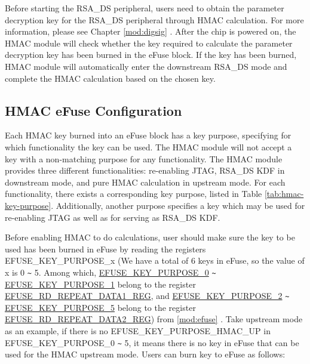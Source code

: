 \documentclass[main\_\_EN.tex]{subfiles}
\begin{document}
Before starting the RSA\_DS peripheral, users need to obtain the parameter decryption key for the RSA\_DS peripheral through HMAC calculation. For more information, please see Chapter \ref{mod:digsig} \textit{}.
After the chip is powered on, the HMAC module will check whether the key required to calculate the parameter decryption key has been burned in the eFuse block. If the key has been burned, HMAC module will automatically enter the downstream RSA\_DS mode and complete the HMAC calculation based on the chosen key.

\subsection{HMAC eFuse Configuration}
\label{sec:hmac-config-function}

Each HMAC key burned into an eFuse block has a key purpose, specifying for which functionality the key can be used. The HMAC module will not accept a key with a non-matching purpose for any functionality. The HMAC module provides three different functionalities: re-enabling JTAG, RSA\_DS KDF in downstream mode, and pure HMAC calculation in upstream mode. For each functionality, there exists a corresponding key purpose, listed in Table \ref{tab:hmac-key-purpose}. Additionally, another purpose specifies a key which may be used for re-enabling JTAG as well as for serving as RSA\_DS KDF.

Before enabling HMAC to do calculations, user should make sure the key to be used has been burned in eFuse by reading the registers EFUSE\_KEY\_PURPOSE\_x (We have a total of 6 keys in eFuse, so the value of x is 0 \verb+~+ 5. Among which, \hyperref[fielddesc:EFUSEKEYPURPOSE0]{EFUSE\_KEY\_PURPOSE\_0} \verb+~+ \hyperref[fielddesc:EFUSEKEYPURPOSE1]{EFUSE\_KEY\_PURPOSE\_1} belong to the register \hyperref[regdesc:EFUSERDREPEATDATA1REG]{EFUSE\_RD\_REPEAT\_DATA1\_REG}, and \hyperref[fielddesc:EFUSEKEYPURPOSE2]{EFUSE\_KEY\_PURPOSE\_2} \verb+~+ \hyperref[fielddesc:EFUSEKEYPURPOSE5]{EFUSE\_KEY\_PURPOSE\_5} belong to the register \hyperref[regdesc:EFUSERDREPEATDATA2REG]{EFUSE\_RD\_REPEAT\_DATA2\_REG}) from \ref{mod:efuse} \textit{}. Take upstream mode as an example, if there is no EFUSE\_KEY\_PURPOSE\_HMAC\_UP in EFUSE\_KEY\_PURPOSE\_0 \verb+~+ 5, it means there is no key in eFuse that can be used for the HMAC upstream mode. Users can burn key to eFuse as follows:
\end{document}
